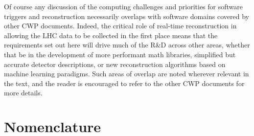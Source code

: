 Of course any discussion of the computing challenges and priorities for software triggers and reconstruction necessarily overlaps with software domains covered by other 
CWP documents. Indeed, the critical role of real-time reconstruction in allowing the LHC data to be collected in the first place means that the requirements set out here 
will drive much of the R\&D across other areas, whether that be in the development of more performant math libraries, simplified but accurate detector descriptions, or 
new reconstruction algorithms based on machine learning paradigms. Such areas of overlap are noted wherever relevant in the text, and the reader is encouraged to refer to 
the other CWP documents for more details.

\section{Nomenclature}

